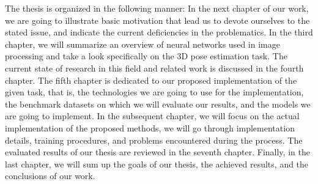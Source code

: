 \vspace{5mm}
\noindent The thesis is organized in the following manner: In the next chapter of our work, we are going to illustrate basic motivation that lead us to devote ourselves to the stated issue, and indicate the current deficiencies in the problematics. In the third chapter, we will summarize an overview of neural networks used in image processing and take a look specifically on the 3D pose estimation task. The current state of research in this field and related work is discussed in the fourth chapter. The fifth chapter is dedicated to our proposed implementation of the given task, that is, the technologies we are going to use for the implementation, the benchmark datasets on which we will evaluate our results, and the models we are going to implement. In the subsequent chapter, we will focus on the actual implementation of the proposed methods, we will go through implementation details, training procedures, and problems encountered during the process. The evaluated results of our thesis are reviewed in the seventh chapter. Finally, in the last chapter, we will sum up the goals of our thesis, the achieved results, and the conclusions of our work.
